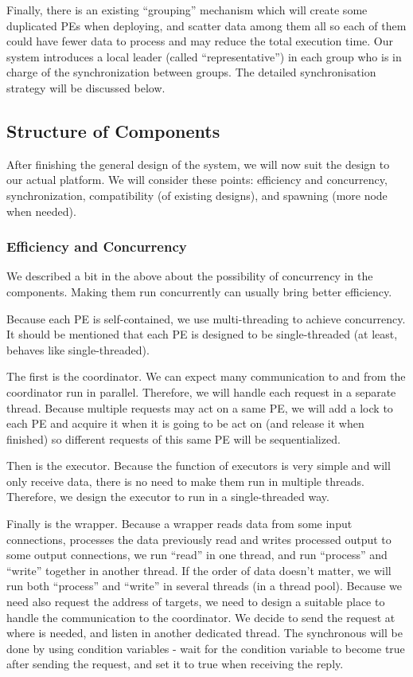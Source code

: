 \documentclass[•]{article}
\begin{document}
	Finally, there is an existing ``grouping'' mechanism which will create some duplicated PEs when deploying, and scatter data among them all so each of them could have fewer data to process and may reduce the total execution time. Our system introduces a local leader (called ``representative'') in each group who is in charge of the synchronization between groups. The detailed synchronisation strategy will be discussed below.
	
	\subsection{Structure of Components}
	After finishing the general design of the system, we will now suit the design to our actual platform. We will consider these points: efficiency and concurrency, synchronization, compatibility (of existing designs), and spawning (more node when needed).
	
	\subsubsection{Efficiency and Concurrency}
	We described a bit in the above  about the possibility of concurrency in the components. Making them run concurrently can usually bring better efficiency.
	
	Because each PE is self-contained, we use multi-threading to achieve concurrency. It should be mentioned that each PE is designed to be single-threaded (at least, behaves like single-threaded).
	
	The first is the coordinator. We can expect many communication to and from the coordinator run in parallel. Therefore, we will handle each request in a separate thread. Because multiple requests may act on a same PE, we will add a lock to each PE and acquire it when it is going to be act on (and release it when finished) so different requests of this same PE will be sequentialized.
	
	Then is the executor. Because the function of executors is very simple and will only receive data, there is no need to make them run in multiple threads. Therefore, we design the executor to run in a single-threaded way.
	
	Finally is the wrapper. Because a wrapper reads data from some input connections, processes the data previously read and writes processed output to some output connections, we run ``read'' in one thread, and run ``process'' and ``write'' together in another thread. If the order of data doesn't matter, we will run both ``process'' and ``write'' in several threads (in a thread pool). Because we need also request the address of targets, we need to design a suitable place to handle the communication to the coordinator. We decide to send the request at where is needed, and listen in another dedicated thread. The synchronous will be done by using condition variables - wait for the condition variable to become true after sending the request, and set it to true when receiving the reply.
	
\end{document}
